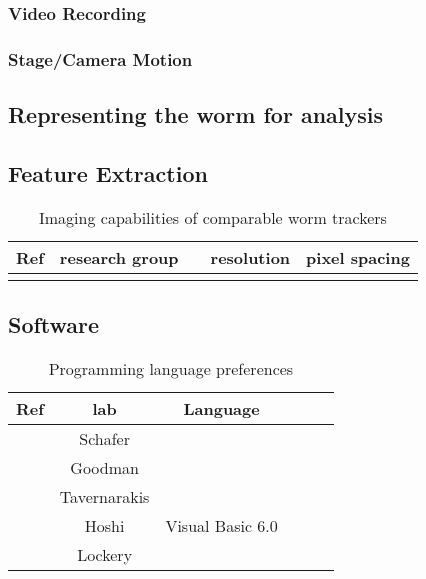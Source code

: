 \documentclass[main.tex]{subfiles}
\begin{document}
\subsubsection{Video Recording}
\subsubsection{Stage/Camera Motion}

\subsection{Representing the worm for analysis}
\subsection{Feature Extraction}
\begin{table}[!htbp]
  \centering
  \begin{tabular}{ccccc}
\toprule
Ref     & research group &  & resolution & pixel spacing \\
\midrule
\cite{} &                                                \\

\bottomrule
  \end{tabular}
  \caption{Imaging capabilities of comparable worm trackers}
  \label{tab:features}
\end{table}

\subsection{Software}
\begin{table}[!htbp]
  \centering
  \begin{tabular}{cccccc}
\toprule
Ref                 & lab          & Language         \\
\midrule
\cite{yemini2013}   & Schafer      &                  \\
\cite{ramot2008}    & Goodman      &                  \\
\cite{tsibidis2007} & Tavernarakis &                  \\
\cite{hoshi2006}    & Hoshi        & Visual Basic 6.0 \\
\cite{pierce1999}   & Lockery      &                  \\
\bottomrule
  \end{tabular}
  \caption{Programming language preferences}
  \label{tab:trackers-lang}
\end{table}
\end{document}

